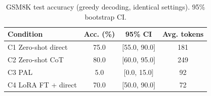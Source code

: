 \begin{table}[t]
\centering
\caption{GSM8K test accuracy (greedy decoding, identical settings). 95\% bootstrap CI.}
\label{tab:main}
\begin{tabular}{lccc}
\toprule
Condition & Acc. (\%) & 95\% CI & Avg. tokens \\
\midrule
C1 Zero-shot direct & 75.0 & [55.0, 90.0] & 181 \\
C2 Zero-shot CoT & 80.0 & [60.0, 95.0] & 249 \\
C3 PAL & 5.0 & [0.0, 15.0] & 92 \\
C4 LoRA FT + direct & 70.0 & [50.0, 90.0] & 72 \\
\bottomrule
\end{tabular}
\end{table}